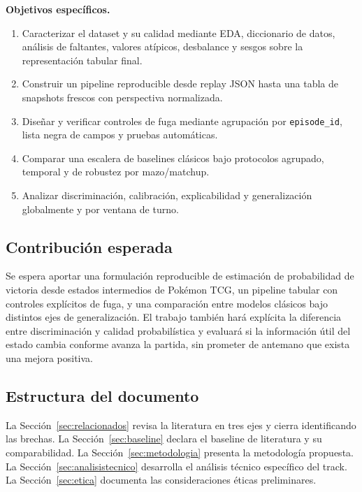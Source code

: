 \noindent\textbf{Objetivos específicos.}
\begin{enumerate}
  \item Caracterizar el dataset y su calidad mediante EDA, diccionario
  de datos, análisis de faltantes, valores atípicos, desbalance y
  sesgos sobre la representación tabular final.
  \item Construir un pipeline reproducible desde replay JSON hasta una
  tabla de snapshots frescos con perspectiva normalizada.
  \item Diseñar y verificar controles de fuga mediante agrupación por
  \texttt{episode\_id}, lista negra de campos y pruebas automáticas.
  \item Comparar una escalera de baselines clásicos bajo protocolos
  agrupado, temporal y de robustez por mazo/matchup.
  \item Analizar discriminación, calibración, explicabilidad y
  generalización globalmente y por ventana de turno.
\end{enumerate}

\subsection{Contribución esperada}
\label{subsec:contribucion}
Se espera aportar una formulación reproducible de estimación de
probabilidad de victoria desde estados intermedios de Pokémon TCG, un
pipeline tabular con controles explícitos de fuga, y una comparación
entre modelos clásicos bajo distintos ejes de generalización. El
trabajo también hará explícita la diferencia entre discriminación y
calidad probabilística y evaluará si la información útil del estado
cambia conforme avanza la partida, sin prometer de antemano que exista
una mejora positiva.

\subsection{Estructura del documento}
\label{subsec:estructura}
La Sección~\ref{sec:relacionados} revisa la literatura en tres ejes y
cierra identificando las brechas. La Sección~\ref{sec:baseline} declara
el baseline de literatura y su comparabilidad. La
Sección~\ref{sec:metodologia} presenta la metodología propuesta. La
Sección~\ref{sec:analisistecnico} desarrolla el análisis técnico
específico del track. La Sección~\ref{sec:etica} documenta las
consideraciones éticas preliminares.
